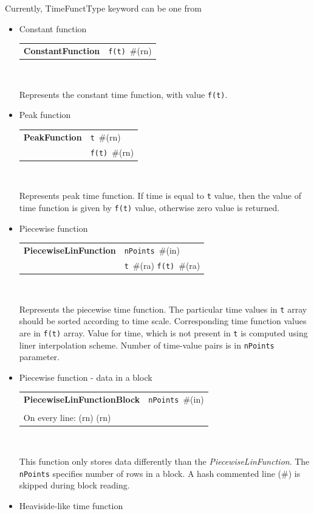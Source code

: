 \documentclass[a4paper]{article}
\makeatletter
\newcommand{\param}[1]{\texttt{#1}} %
\newcommand{\field}[2]{\param{#1}~\#{\tiny(#2)}} %
\newcommand{\entKeywordInst}[1]{\textbf{#1}} %
\newenvironment{record}[1][]{\begin{tabular}{|ll}}{\end{tabular}\\}
\newcommand{\recentry}[2]{{#1}&{#2}\\}
\newcounter{rcc}
\newenvironment{record}[1][\textwidth]{\setcounter{rcc}{0}\begin{tabular*}{#1}{|ll@{\extracolsep{\fill}}r}}{\end{tabular*}\\}
\newcommand{\recentry}[2]{\ifthenelse{\value{rcc}>0}{&$\backslash$ \\}{\setcounter{rcc}{1}}{#1}&{#2}}
\makeatother
\begin{document}
Currently, TimeFunctType keyword can be one from
\begin{itemize}
\item Constant function

\noindent
\begin{record}[0.9\textwidth]
  \recentry{\entKeywordInst{ConstantFunction}}{\field{f(t)}{rn}}
\end{record}

Represents the constant time function, with value \param{f(t)}.

\item Peak function

\begin{record}[0.9\textwidth]
  \recentry{\entKeywordInst{PeakFunction}}{\field{t}{rn}}
  \recentry{}{\field{f(t)}{rn}}
\end{record}

Represents peak time function. If time is equal to \param{t}
value, then the value of time function is given by \param{f(t)} value,
otherwise zero value is returned.

\item Piecewise function

\begin{record}[0.9\textwidth]
  \recentry{\entKeywordInst{PiecewiseLinFunction}}{\field{nPoints}{in}}
  \recentry{}{\field{t}{ra} \field{f(t)}{ra}}
\end{record}

Represents the piecewise time function. The particular time values in
\param{t} array  should be sorted according to time scale. Corresponding time
function values are in \param{f(t)} array. Value for time, which
is not present in \param{t} is computed using liner interpolation scheme.
Number of time-value pairs is in \param{nPoints} parameter.

\item Piecewise function - data in a block

\begin{record}[0.9\textwidth]
  \recentry{\entKeywordInst{PiecewiseLinFunctionBlock}}{\field{nPoints}{in}}\\
  On every line: {(rn) (rn)}
\end{record}

This function only stores data differently than the {\it PiecewiseLinFunction}. 
The \param{nPoints} specifies number of rows in a block. A hash commented line (\#) is 
skipped during block reading.

\item Heaviside-like time function


\end{itemize}
\end{document}
